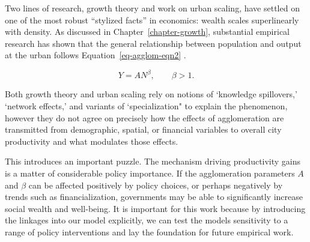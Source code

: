 Two lines of research, growth theory and work on urban scaling, have settled on one of the most robust ``stylized facts'' in economics: wealth scales superlinearly with density. As discussed in Chapter~\ref{chapter-growth}, substantial empirical research has shown that the general relationship between population and output at the urban %
follows Equation~\ref{eq-agglom-eqn2} \cite{loboUrbanScalingProduction2013}.%

\begin{equation}\label{eq-agglom-eqn2}
    Y=AN^\beta,\qquad \beta>1. 
\end{equation}

Both growth theory and urban scaling rely on %
notions of `knowledge spillovers,' `network effects,' and variants of `specialization" to explain the phenomenon, however they do not agree on precisely how the effects of agglomeration are transmitted from demographic, spatial, or financial variables to overall city productivity and what modulates those effects.  

This introduces an important puzzle. The mechanism driving productivity gains is a matter of considerable policy importance. If the agglomeration parameters $A$ and  $\beta$ can be affected positively by policy choices, or perhaps negatively by trends such as financialization,  governments may be able to significantly increase social wealth and well-being.  It is important for this work because by introducing the linkages into our model explicitly, we can test the models sensitivity to a range of policy interventions and lay the foundation for future empirical work.




